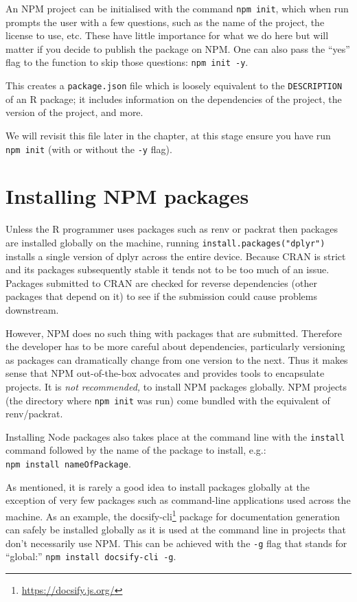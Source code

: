 \documentclass[
  10pt,
]{krantz}
\renewcommand{\href}[2]{#2\footnote{\url{#1}}}
\begin{document}
An NPM project can be initialised with the command \texttt{npm\ init}, which when run prompts the user with a few questions, such as the name of the project, the license to use, etc. These have little importance for what we do here but will matter if you decide to publish the package on NPM. One can also pass the ``yes'' flag to the function to skip those questions: \texttt{npm\ init\ -y}.

This creates a \texttt{package.json} file which is loosely equivalent to the \texttt{DESCRIPTION} of an R package; it includes information on the dependencies of the project, the version of the project, and more.

We will revisit this file later in the chapter, at this stage ensure you have run \texttt{npm\ init} (with or without the \texttt{-y} flag).

\hypertarget{webpack-intro-install-pkgs}{%
\section{Installing NPM packages}\label{webpack-intro-install-pkgs}}

Unless the R programmer uses packages such as renv \citep{R-renv} or packrat \citep{R-packrat} then packages are installed globally on the machine, running \texttt{install.packages("dplyr")} installs a single version of dplyr across the entire device. Because CRAN is strict and its packages subsequently stable it tends not to be too much of an issue. Packages submitted to CRAN are checked for reverse dependencies (other packages that depend on it) to see if the submission could cause problems downstream.

However, NPM does no such thing with packages that are submitted. Therefore the developer has to be more careful about dependencies, particularly versioning as packages can dramatically change from one version to the next. Thus it makes sense that NPM out-of-the-box advocates and provides tools to encapsulate projects. It is \emph{not recommended,} to install NPM packages globally. NPM projects (the directory where \texttt{npm\ init} was run) come bundled with the equivalent of renv/packrat.

Installing Node packages also takes place at the command line with the \texttt{install} command followed by the name of the package to install, e.g.: \texttt{npm\ install\ nameOfPackage}.

As mentioned, it is rarely a good idea to install packages globally at the exception of very few packages such as command-line applications used across the machine. As an example, the \href{https://docsify.js.org/}{docsify-cli} package for documentation generation can safely be installed globally as it is used at the command line in projects that don't necessarily use NPM. This can be achieved with the \texttt{-g} flag that stands for ``global:'' \texttt{npm\ install\ docsify-cli\ -g}.
\end{document}
